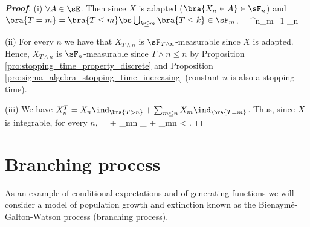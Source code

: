 \begin{proof}[\bf Proof]
\ben
\item [(i)] $\forall A \in \sE$. Then since $X$ is adapted ($\bra{X_n \in A} \in \sF_n$) and $\bra{T = m} = \bra{T \leq m} \bs \bigcup_{k\leq m} \bra{T \leq k} \in \sF_m$.
\be
{} \cap {} = \bigcup^n_{m=1}  \cap {} \in \sF_n
\ee

\item [(ii)] For every $n$ we have that $X_{T\land n}$ is $\sF_{T\land n}$-measurable since $X$ is adapted. Hence, $X_{T\land n}$ is $\sF_n$-measurable since $T \land n \leq n$ by Proposition \ref{pro:stopping_time_property_discrete} and Proposition \ref{pro:sigma_algebra_stopping_time_increasing} (constant $n$ is also a stopping time).
\item [(iii)] We have $X_n^T = X_n \ind_{\bra{T>n}} + \sum_{m\leq n}X_m \ind_{\bra{T=m}}$. Thus, since $X$ is integrable, for every $n$,
\be
\E{} = \E{} \leq \E{} + \sum_{m\leq n} \ind_{} \leq \E{} + \sum_{m\leq n} < \infty.
\ee


\een
\end{proof}

\section{Branching process}

As an example of conditional expectations and of generating functions we will consider a model of population growth and extinction known as the Bienaym\'e-Galton-Watson process (branching process).

